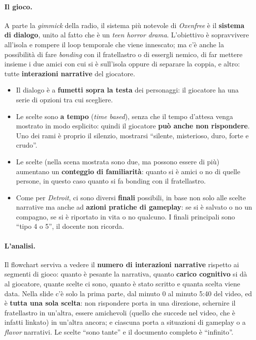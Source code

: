 \paragraph{Il gioco.} A parte la \emph{gimmick} della radio, il sistema più
notevole di \emph{Oxenfree} è il \textbf{sistema di dialogo}, unito al fatto
che è un \emph{teen horror drama}. L'obiettivo è sopravvivere all'isola e
rompere il loop temporale che viene innescato; ma c'è anche la possibilità di
fare \emph{bonding} con il fratellastro o di essergli nemico, di far mettere
insieme i due amici con cui si è sull'isola oppure di separare la coppia, e
altro: tutte \textbf{interazioni narrative} del giocatore.
\begin{itemize}
  \item Il dialogo è a \textbf{fumetti sopra la testa} dei personaggi: il
        giocatore ha una serie di opzioni tra cui scegliere.
  \item Le scelte sono \textbf{a tempo} (\emph{time based}), senza che il
        tempo d'attesa venga mostrato in modo esplicito: quindi il
        giocatore \textbf{può anche non rispondere}. Uno dei rami è proprio
        il silenzio, mostrarsi ``silente, misterioso, duro, forte e
        crudo''.
  \item Le scelte (nella scena mostrata sono due, ma possono essere di più)
        aumentano un \textbf{conteggio di familiarità}: quanto si è amici o
        no di quelle persone, in questo caso quanto si fa bonding con il
        fratellastro.
  \item Come per \emph{Detroit}, ci sono diversi \textbf{finali} possibili,
        in base non solo alle scelte narrative ma anche ad \textbf{azioni
        pratiche di gameplay}: se si è salvato o no un compagno, se si è
        riportato in vita o no qualcuno. I finali principali sono ``tipo 4
        o 5'', il docente non ricorda.
\end{itemize}

\paragraph{L'analisi.} Il flowchart serviva a vedere il \textbf{numero di
interazioni narrative} rispetto ai segmenti di gioco: quanto è pesante la
narrativa, quanto \textbf{carico cognitivo} si dà al giocatore, quante scelte
ci sono, quanto è stato scritto e quanta scelta viene data. Nella slide c'è
solo la prima parte, dal minuto 0 al minuto 5:40 del video, ed è
\textbf{tutta una sola scelta}: non rispondere porta in una direzione,
schernire il fratellastro in un'altra, essere amichevoli (quello che succede
nel video, che è infatti linkato) in un'altra ancora; e ciascuna porta a
situazioni di gameplay o a \emph{flavor} narrativi. Le scelte ``sono tante''
e il documento completo è ``infinito''.

